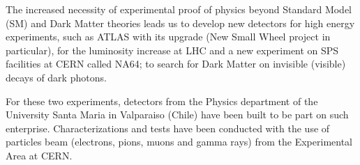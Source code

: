 	The increased necessity of experimental proof of physics beyond Standard Model (SM) and Dark Matter theories leads us
	to develop new detectors for high energy experiments, such as ATLAS with its upgrade (New Small Wheel project in
	particular), for the luminosity increase at LHC and a new experiment on SPS facilities at CERN called NA64; to search
	for Dark Matter on invisible (visible) decays of dark photons.\par
		For these two experiments, detectors from the Physics department of the University Santa Maria
in Valparaiso (Chile)	have been built to be part on such enterprise.
	Characterizations and tests have been conducted with the use of particles beam (electrons, pions, muons and gamma rays) from the Experimental Area at CERN.\par

